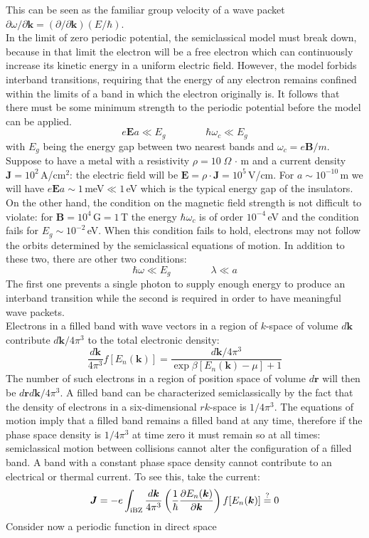 \documentclass[10.75pt,a4paper,openright,bottom=2cm]{article}
\renewcommand{\Vec}[1]{\boldsymbol{#1}}
\newcommand{\RN}[1]{%
  \textup{\uppercase\expandafter{\romannumeral#1}}%
}
\begin{document}
This can be seen as the familiar group velocity of a wave packet $\partial\omega/\partial\Vec{k}=(\partial/\partial\Vec{k})(E/\hbar)$.\\
In the limit of zero periodic potential, the semiclassical model must break down, because in that limit the electron will be a free electron which can continuously increase its kinetic energy in a uniform electric field. However, the model forbids interband transitions, requiring that the energy of any electron remains confined within the limits of a band in which the electron originally is. It follows that there must be some minimum strength to the periodic potential before the model can be applied. 
\[
e\Vec{E}a\ll E_g \qquad\qquad \hbar\omega_c\ll E_g 
\]
with $E_g$ being the energy gap between two nearest bands and $\omega_c=e\Vec{B}/m$.\\
Suppose to have a metal with a resistivity $\rho=10\;\Omega\,\cdot$\,m and a current density $\Vec{J}=10^2$\,A/cm$^2$: the electric field will be $\Vec{E}=\rho\cdot\Vec{J}=10^5$\,V/cm. For $a\sim10^{-10}$\,m we will have $e\Vec{E}a\sim1$\,meV$\ll1$\,eV which is the typical energy gap of the insulators. On the other hand, the condition on the magnetic field strength is not difficult to violate: for $\Vec{B}=10^4$\,G$=1$\,T the energy $\hbar\omega_c$ is of order $10^{-4}$\,eV and the condition fails for $E_g\sim10^{-2}$\,eV. When this condition fails to hold, electrons may not follow the orbits determined by the semiclassical equations of motion. In addition to these two, there are other two conditions:
\[
\hbar\omega\ll E_g \qquad \qquad \lambda\ll a
\]
The first one prevents a single photon to supply enough energy to produce an interband transition while the second is required in order to have meaningful wave packets.\\
Electrons in a filled band with wave vectors in a region of $k$-space of volume $d\Vec{k}$ contribute $d\Vec{k}/4\pi^3$ to the total electronic density:
\[
\frac{d\Vec{k}}{4\pi^3}f[E_n(\Vec{k})]=\frac{d\Vec{k}/4\pi^3}{\exp{\beta[E_n(\Vec{k})-\mu]}+1}
\]
The number of such electrons in a region of position space of volume $d\Vec{r}$ will then be $d\Vec{r}d\Vec{k}/4\pi^3$. A filled band can be characterized semiclassically by the fact that the density of electrons in a six-dimensional $rk$-space is $1/4\pi^3$. The equations of motion imply that a filled band remains a filled band at any time, therefore if the phase space density is $1/4\pi^3$ at time zero it must remain so at all times: semiclassical motion between collisions cannot alter the configuration of a filled band. A band with a constant phase space density cannot contribute to an electrical or thermal current. To see this, take the current:
\[
\Vec{J}=-e\int_{\text{\RN{1}BZ}}\frac{d\Vec{k}}{4\pi^3}\left(\frac{1}{\hbar}\frac{\partial E_n(\Vec{k})}{\partial\Vec{k}}\right)f[E_n(\Vec{k})]\stackrel{?}{=}0
\]
Consider now a periodic function in direct space
\end{document}
